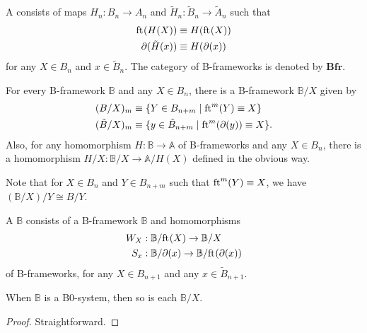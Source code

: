 \begin{defn}
A  consists of maps
$H_n:B_n\to A_n$ and $\tilde{H}_n:\tilde{B}_n\to\tilde{A}_n$ such that
\begin{align*}
\mathrm{ft}_{}(H(X)) & \equiv H(\mathrm{ft}_{}(X)) \\
\partial_{}(\tilde{H}(x)) & \equiv H(\partial_{}(x))
\end{align*}
for any $X\in B_n$ and $x\in\tilde{B}_n$. The category of B-frameworks is
denoted by $\mathbf{Bfr}$. 
\end{defn}

\begin{defn}
For every B-framework $\mathbb{B}$ and any $X\in B_n$, there is a B-framework
$\mathbb{B}/X$ given by
\begin{align*}
(B/X)_{m} & \equiv \{Y\in B_{n+m}\mid\mathrm{ft}_{}^{m}(Y)\equiv X\}\\
(\tilde{B}/X)_m & \equiv \{y\in \tilde{B}_{n+m}\mid\mathrm{ft}_{}^m(\partial_{}(y))\equiv X\}.
\end{align*}
Also, for any homomorphism $H:\mathbb{B}\to\mathbb{A}$ of B-frameworks and any
$X\in B_n$, there is a homomorphism $H/X:\mathbb{B}/X\to\mathbb{A}/H(X)$
defined in the obvious way.
\end{defn}

\begin{rmk}
Note that for $X\in B_n$ and $Y\in B_{n+m}$ such that $\mathrm{ft}_{}^m(Y)\equiv X$, 
we have $(\mathbb{B}/X)/Y\cong B/Y$.
\end{rmk}

\begin{defn}
A  $\mathbb{B}$ consists of a B-framework $\mathbb{B}$ and homomorphisms
\begin{align*}
W_{X} & : \mathbb{B}/\mathrm{ft}_{}(X)\to\mathbb{B}/X\\
S_{x} & : \mathbb{B}/\partial_{}(x)\to\mathbb{B}/\mathrm{ft}_{}(\partial_{}(x))
\end{align*}
of B-frameworks, for any $X\in B_{n+1}$ and any $x\in\tilde{B}_{n+1}$. 
\end{defn}

\begin{lem}
When $\mathbb{B}$ is a B0-system, then so is each $\mathbb{B}/X$.
\end{lem}

\begin{proof}
Straightforward.
\end{proof}

